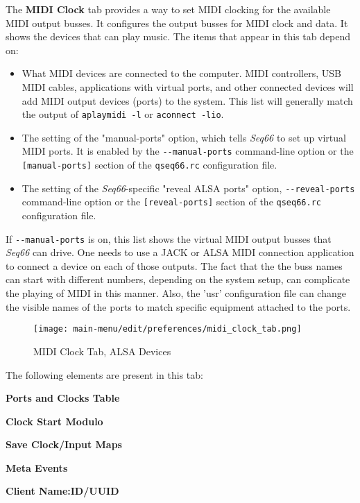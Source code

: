    The \textbf{MIDI Clock} tab provides a way to set MIDI clocking for
   the available MIDI output busses.
   It configures the output busses for MIDI clock and data.
   It shows the devices that can play music.
   The items that appear in this tab depend on:

   \begin{itemize}
      \item What MIDI devices are connected to the computer.
         MIDI controllers, USB MIDI cables, applications with virtual
         ports, and other connected devices will add MIDI
         output devices (ports) to the system.
         This list will generally match the output of \texttt{aplaymidi -l}
         or \texttt{aconnect -lio}.
      \item The setting of the "manual-ports" option, which tells
         \textsl{Seq66} to set up virtual MIDI ports.
         It is enabled by the
         \texttt{-{}-manual-ports} command-line option or the
         \texttt{[manual-ports]} section of the
         \texttt{qseq66.rc} configuration file.
      \item The setting of the \textsl{Seq66}-specific
         "reveal ALSA ports" option,
         \texttt{-{}-reveal-ports} command-line option or the
         \texttt{[reveal-ports]} section of the
         \texttt{qseq66.rc} configuration file.
   \end{itemize}

   If \texttt{-{}-manual-ports} is on, this list shows the virtual
   MIDI output busses that \textsl{Seq66} can drive.
   One needs to use a JACK or ALSA MIDI
   connection application to connect a device on each of those outputs.
   The fact that the the buss names can
   start with different numbers, depending on the system setup, can complicate
   the playing of MIDI in this manner.  Also, the 'usr' configuration file can
   change the visible names of the ports to match specific equipment attached
   to the ports.

\begin{figure}[H]
   \centering 
   \texttt{[image: main-menu/edit/preferences/midi\_clock\_tab.png]}
   \caption{MIDI Clock Tab, ALSA Devices}
   \label{fig:midi_clock_tab}
\end{figure}

   The following elements are present in this tab:

   \begin{enumber}
      \item \textbf{Ports and Clocks Table}
      \item \textbf{Clock Start Modulo}
      \item \textbf{Save Clock/Input Maps}
      \item \textbf{Meta Events}
      \item \textbf{Client Name:ID/UUID}
   \end{enumber}

